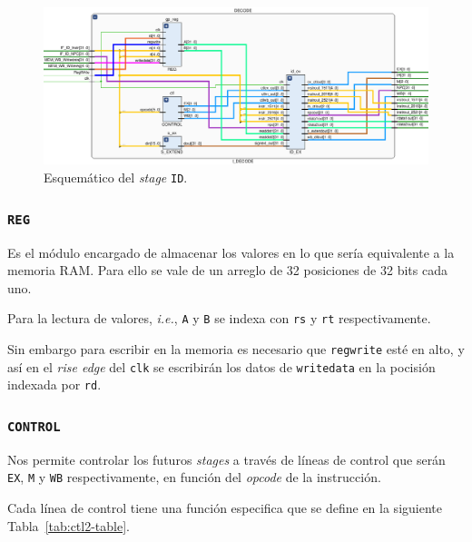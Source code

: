 \documentclass[a4paper]{article}
\begin{document}
\begin{figure}[H]
	\begin{center}				
	\includegraphics[width=1.4\textwidth,center]{TP4_7.png}
  	\caption{Esquemático del \textit{stage} \texttt{ID}.}
  	\label{fig:funcionamiento.}
  	\end{center}
\end{figure}

\subsubsection{\texttt{REG}}
Es el módulo encargado de almacenar los valores en lo que sería equivalente a la memoria RAM. Para ello se vale de un arreglo de 32 posiciones de 32 bits cada uno. 

Para la lectura de valores, \textit{i.e.}, \texttt{A} y \texttt{B} se indexa con \texttt{rs} y \texttt{rt} respectivamente.

Sin embargo para escribir en la memoria es necesario que \texttt{regwrite} esté en alto, y así en el \textit{rise edge} del \texttt{clk} se escribirán los datos de \texttt{writedata} en la pocisión indexada por \texttt{rd}.

\subsubsection{\texttt{CONTROL}}
Nos permite controlar los futuros \textit{stages} a través de líneas de control que serán \texttt{EX}, \texttt{M} y \texttt{WB} respectivamente, en función del \textit{opcode} de la instrucción.

Cada línea de control tiene una función especifica que se define en la siguiente Tabla~\ref{tab:ctl2-table}.
\end{document}
